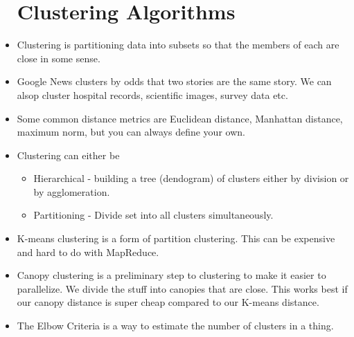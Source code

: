\documentclass{scrartcl}
\begin{document}
\begin{itemize}
\section*{Clustering Algorithms}
\item Clustering is partitioning data into subsets so that the members of
	each are close in some sense.
\item Google News clusters by odds that two stories are the same story.
	We can alsop cluster hospital records, scientific images, survey data etc.
\item Some common distance metrics are Euclidean distance, Manhattan distance,
	maximum norm, but you can always define your own.
\item Clustering can either be 
	\begin{itemize}
	\item Hierarchical - building a tree (dendogram) of clusters either by
		division or by agglomeration.
	\item Partitioning - Divide set into all clusters simultaneously.
	\end{itemize}
\item K-means clustering is a form of partition clustering. This can be
	expensive and hard to do with MapReduce.
\item Canopy clustering is a preliminary step to clustering to make it easier
	to parallelize. We divide the stuff into canopies that are close. This 
	works best if our canopy distance is super cheap compared to our K-means
	distance.
\item The Elbow Criteria is a way to estimate the number of clusters in a thing.

\end{itemize}
\end{document}
